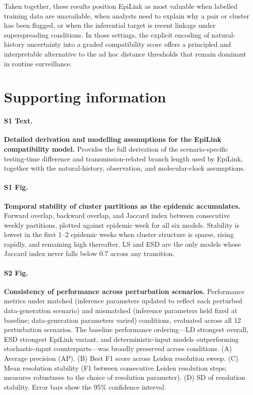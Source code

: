 \documentclass[10pt,letterpaper]{article}
\begin{document}
Taken together, these results position EpiLink as most valuable when labelled training data are unavailable, when analysts need to explain why a pair or cluster has been flagged, or when the inferential target is recent linkage under superspreading conditions. In those settings, the explicit encoding of natural-history uncertainty into a graded compatibility score offers a principled and interpretable alternative to the ad hoc distance thresholds that remain dominant in routine surveillance.

\section*{Supporting information}

\paragraph*{S1 Text.}\label{par:S1_Text}
\textbf{Detailed derivation and modelling assumptions for the EpiLink compatibility model.}
Provides the full derivation of the scenario-specific testing-time difference and transmission-related branch length used by EpiLink, together with the natural-history, observation, and molecular-clock assumptions.

\paragraph*{S1 Fig.}\label{par:S1_Fig}
\textbf{Temporal stability of cluster partitions as the epidemic accumulates.}
Forward overlap, backward overlap, and Jaccard index between consecutive weekly partitions, plotted against epidemic week for all six models. Stability is lowest in the first 1--2 epidemic weeks when cluster structure is sparse, rising rapidly, and remaining high thereafter. LS and ESD are the only models whose Jaccard index never falls below 0.7 across any transition.

\paragraph*{S2 Fig.}\label{par:S2_Fig}
\textbf{Consistency of performance across perturbation scenarios.}
Performance metrics under matched (inference parameters updated to reflect each perturbed data-generation scenario) and mismatched (inference parameters held fixed at baseline; data-generation parameters varied) conditions, evaluated across all 12 perturbation scenarios. The baseline performance ordering---LD strongest overall, ESD strongest EpiLink variant, and deterministic-input models outperforming stochastic-input counterparts---was broadly preserved across conditions. (A) Average precision (AP). (B) Best F1 score across Leiden resolution sweep. (C) Mean resolution stability (F1 between consecutive Leiden resolution steps; measures robustness to the choice of resolution parameter). (D) SD of resolution stability. Error bars show the 95\% confidence interval.
\end{document}
